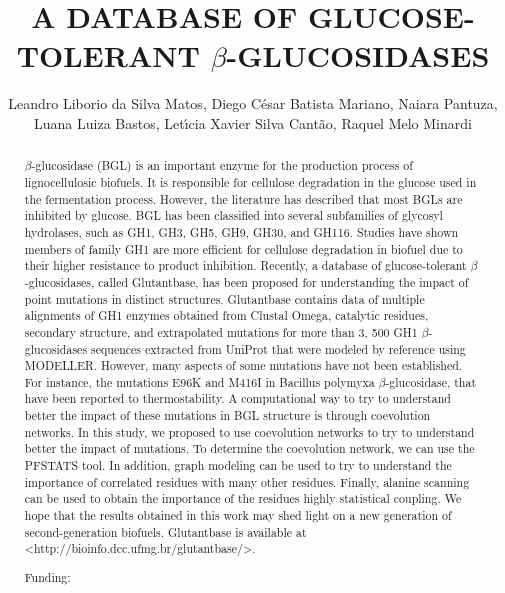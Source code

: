 \documentclass[twoside]{article}
\title{\vspace{-15mm}\fontsize{24pt}{10pt}\selectfont\textbf{ A DATABASE OF GLUCOSE-TOLERANT $\beta$-GLUCOSIDASES }} %
\author{ Leandro Liborio da Silva Matos, Diego C\'esar Batista Mariano, Naiara Pantuza, Luana Luiza Bastos, Let\'{\i}cia Xavier Silva Cant\~ao, Raquel Melo Minardi }
\affil{ Universidade Federal de Minas Gerais - UFMG }
\date{}
\begin{document}
  
  
  \maketitle %
  
  
  \thispagestyle{fancy} %
  
  
  \begin{abstract}
  $\beta$-glucosidase (BGL) is an important enzyme for the production process of lignocellulosic biofuels. It is responsible for cellulose degradation in the glucose used in the fermentation process. However,  the literature has described that most BGLs are inhibited by glucose. BGL has been classified into several subfamilies of glycosyl hydrolases,  such as GH1,  GH3,  GH5,  GH9,  GH30,  and GH116. Studies have shown members of family GH1 are more efficient for cellulose degradation in biofuel due to their higher resistance to product inhibition. Recently,  a database of glucose-tolerant $\beta$-glucosidases,  called Glutantbase,  has been proposed for understanding the impact of point mutations in distinct structures. Glutantbase contains data of multiple alignments of GH1 enzymes obtained from Clustal Omega,  catalytic residues,  secondary structure,  and extrapolated mutations for more than 3, 500 GH1 $\beta$-glucosidases sequences extracted from UniProt that were modeled by reference using MODELLER. However,  many aspects of some mutations have not been established. For instance,  the mutations E96K and M416I in Bacillus polymyxa $\beta$-glucosidase,  that have been reported to thermostability. A computational way to try to understand better the impact of these mutations in BGL structure is through coevolution networks. In this study,  we proposed to use coevolution networks to try to understand better the impact of mutations. To determine the coevolution network,  we can use the PFSTATS tool. In addition,  graph modeling can be used to try to understand the importance of correlated residues with many other residues. Finally,  alanine scanning can be used to obtain the importance of the residues highly statistical coupling. We hope that the results obtained in this work may shed light on a new generation of second-generation biofuels. Glutantbase is available at <http://bioinfo.dcc.ufmg.br/glutantbase/>.
  
  Funding:  \\ 
  \end{abstract}
  
\end{document}
